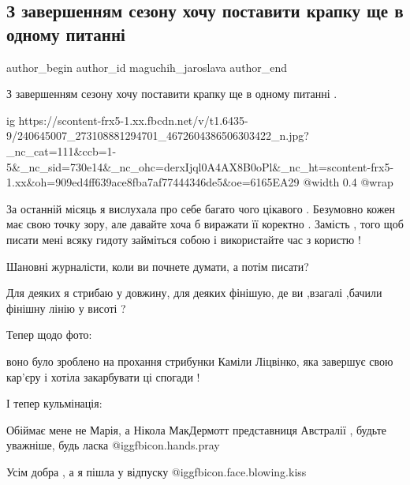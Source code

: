  
 
 
 
 
 
\subsection{З завершенням сезону хочу  поставити крапку ще в одному питанні}
\label{sec:10_09_2021.fb.maguchih_jaroslava.1.foto_lasickene_new}
 
\ifcmt
 author_begin
   author_id maguchih_jaroslava
 author_end
\fi

З завершенням сезону хочу  поставити крапку  ще в одному питанні .

\ifcmt
  ig https://scontent-frx5-1.xx.fbcdn.net/v/t1.6435-9/240645007_273108881294701_4672604386506303422_n.jpg?_nc_cat=111&ccb=1-5&_nc_sid=730e14&_nc_ohc=derxIjql0A4AX8B0oPl&_nc_ht=scontent-frx5-1.xx&oh=909ed4ff639ace8fba7af77444346de5&oe=6165EA29
  @width 0.4
  @wrap 
\fi

За останній  місяць я вислухала про себе багато чого цікавого . Безумовно кожен
має свою точку зору, але давайте хоча б виражати її коректно . Замість , того
щоб писати мені всяку гидоту займіться собою і використайте час з користю !

Шановні журналісти, коли ви почнете думати, а потім писати?

Для деяких я стрибаю у довжину, для деяких фінішую, де ви ,взагалі ,бачили
фінішну лінію у висоті ?

Тепер щодо фото: 

воно було зроблено на прохання  стрибунки Каміли Ліцвінко, яка завершує свою
кар’єру  і хотіла закарбувати ці спогади !

І тепер кульмінація:

Обіймає мене не Марія, а Нікола МакДермотт представниця Австралії , будьте
уважніше, будь ласка @igg{fbicon.hands.pray} 

Усім добра , а я пішла у відпуску  @igg{fbicon.face.blowing.kiss} 
